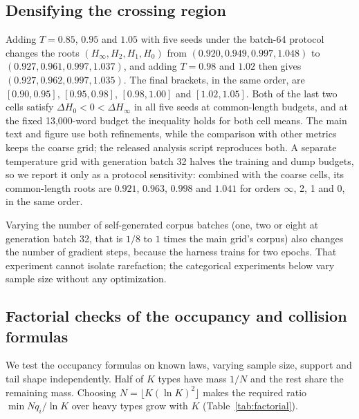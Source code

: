 \documentclass[10pt]{article}
\theoremstyle{plain}
\theoremstyle{definition}
\begin{document}
\subsection{Densifying the crossing region}
\label{app:dense}

Adding $T=0.85$, $0.95$ and $1.05$ with five seeds under the batch-64 protocol changes the roots
$(H_\infty,H_2,H_1,H_0)$ from $(0.920,0.949,0.997,1.048)$ to $(0.927,0.961,0.997,1.037)$, and
adding $T=0.98$ and $1.02$ then gives $(0.927,0.962,0.997,1.035)$. The final brackets, in the same
order, are $[0.90,0.95]$, $[0.95,0.98]$, $[0.98,1.00]$ and $[1.02,1.05]$. Both of the last two
cells satisfy $\Delta H_0<0<\Delta H_\infty$ in all five seeds at common-length budgets, and at the
fixed 13,000-word budget the inequality holds for both cell means. The main text and figure use
both refinements, while the comparison with other metrics keeps the coarse grid; the released
analysis script reproduces both. A separate temperature grid with generation batch 32 halves the
training and dump budgets, so we report it only as a protocol sensitivity: combined with the
coarse cells, its common-length roots are $0.921$, $0.963$, $0.998$ and $1.041$ for orders $\infty$, 2, 1 and 0,
in the same order.

Varying the number of self-generated corpus batches (one, two or eight at generation batch 32, that is $1/8$
to $1$ times the main grid's corpus) also changes the
number of gradient steps, because the harness trains for two epochs. That experiment cannot
isolate rarefaction; the categorical experiments below vary sample size without any optimization.

\subsection{Factorial checks of the occupancy and collision formulas}
\label{app:rarefy-fact}

We test the occupancy formulas on known laws, varying sample size, support and tail shape
independently. Half of $K$ types have mass $1/N$ and the rest share the remaining mass. Choosing
$N=\lfloor K(\ln K)^2\rfloor$ makes the required ratio $\min Nq_i/\ln K$ over heavy types grow with $K$
(Table~\ref{tab:factorial}).
\end{document}
